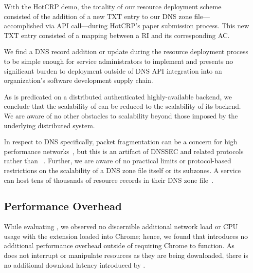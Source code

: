 With the HotCRP demo, the totality of our resource deployment scheme consisted
of the addition of a new TXT entry to our DNS zone file---accomplished via API
call---during HotCRP's paper submission process. This new TXT entry consisted of
a mapping between a RI and its corresponding AC.

We find a DNS record addition or update during the resource deployment process
to be simple enough for service administrators to implement and presents no
significant burden to deployment outside of DNS API integration into an
organization's software development supply chain.

As \SYSTEM{} is predicated on a distributed authenticated highly-available
backend, we conclude that the scalability of \SYSTEM{} can be reduced to the
scalability of its backend. We are aware of no other obstacles to scalability
beyond those imposed by the underlying distributed system.

In respect to DNS specifically, packet fragmentation can be a concern for high
performance networks~\cite{EDNS}, but this is an artifact of DNSSEC and related
protocols rather than \SYSTEM{}~\cite{DNSSEC}. Further, we are aware of no
practical limits or protocol-based restrictions on the scalability of a DNS zone
file itself or its subzones. A service can host tens of thousands of resource
records in their DNS zone file~\cite{DNS1, DNS2}.

\subsection{Performance Overhead}

While evaluating \SYSTEM{}, we observed no discernible additional network load
or CPU usage with the extension loaded into Chrome; hence, we found that
\SYSTEM{} introduces no additional performance overhead outside of requiring
Chrome to function. As \SYSTEM{} does not interrupt or manipulate resources as
they are being downloaded, there is no additional download latency introduced by
\SYSTEM{}.
